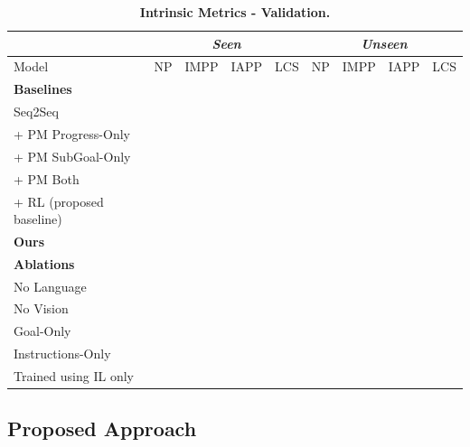 \documentclass[11pt,a4paper]{article}
\begin{document}
\begin{table}[]
\begin{tabular}{@{}lllllllll@{}}
\toprule
                         & \multicolumn{4}{c}{\textit{Seen}} & \multicolumn{4}{c}{\textit{Unseen}} \\ \midrule
Model                    & NP    & IMPP    & IAPP    & LCS   & NP     & IMPP    & IAPP    & LCS    \\ \midrule
\textbf{Baselines}       &       &         &         &       &        &         &         &        \\
Seq2Seq                  &       &         &         &       &        &         &         &        \\
+ PM Progress-Only       &       &         &         &       &        &         &         &        \\
+ PM SubGoal-Only        &       &         &         &       &        &         &         &        \\
+ PM Both                &       &         &         &       &        &         &         &        \\
+ RL (proposed baseline)                &       &         &         &       &        &         &         &        \\ \midrule
\textbf{Ours}            &       &         &         &       &        &         &         &        \\ \midrule
\textbf{Ablations} &       &         &         &       &        &         &         &        \\
No Language              &       &         &         &       &        &         &         &        \\
No Vision                &       &         &         &       &        &         &         &        \\
Goal-Only                &       &         &         &       &        &         &         &        \\
Instructions-Only        &       &         &         &       &        &         &         &        \\
Trained using IL only        &       &         &         &       &        &         &         &        \\
\bottomrule
\end{tabular}
\caption{\textbf{Intrinsic Metrics - Validation.}}
\label{tab:intrinsic}
\end{table}


\subsection{Proposed Approach}
\end{document}
